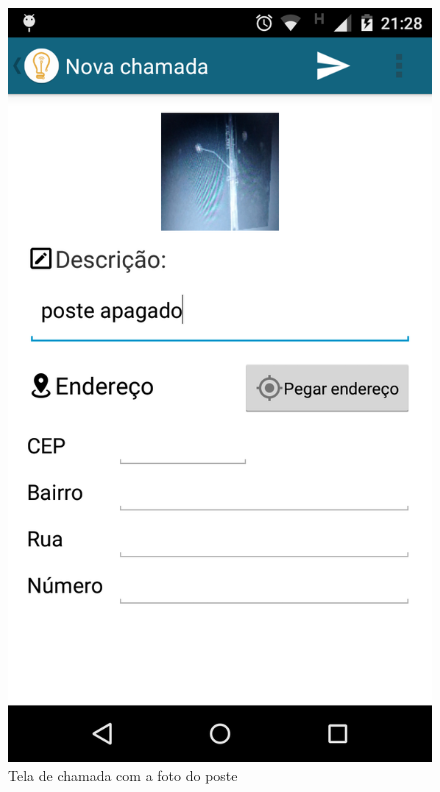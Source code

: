 \documentclass[
	article,			%
	11pt,				%
	oneside,			%
	a4paper,			%
	english,			%
	brazil,				%
	sumario=tradicional
	]{abntex2}
\begin{document}
\begin{figure}[!htbp]
 \centering
  \begin{minipage}{0.4\textwidth}
    \centering
    \caption{\label{android-tela-nova-chamada-foto-poste}Tela de chamada com a foto do poste}
    \includegraphics[scale=0.1]{android/3.png}
  \end{minipage}
  \hfill
  \begin{minipage}{0.4\textwidth}
    \centering

\end{minipage}
\end{figure}
\end{document}
